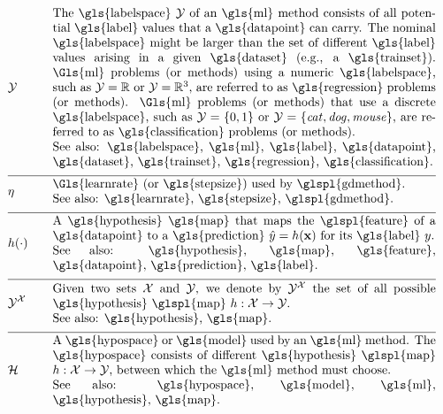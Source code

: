 \begin{align}
	&\labelspace  &\quad & \parbox{.90\textwidth}{The \gls{labelspace} $\labelspace$ of 
		an \gls{ml} method consists of all potential \gls{label} values that a \gls{datapoint} can 
		carry. The nominal \gls{labelspace} might be larger than the set of different \gls{label} 
		values arising in a given \gls{dataset} (e.g., a \gls{trainset}). \Gls{ml} problems 
		(or methods) using a numeric \gls{labelspace}, such as $\labelspace=\mathbb{R}$ 
		or $\labelspace=\mathbb{R}^{3}$, are referred to as \gls{regression} problems (or methods). \Gls{ml} 
		problems (or methods) that use a discrete \gls{labelspace}, such as $\labelspace=\{0,1\}$ or $\labelspace=\{\mbox{\emph{cat}},\mbox{\emph{dog}},\mbox{\emph{mouse}}\}$, 
		are referred to as \gls{classification} problems (or methods).
		\\ See also: \gls{labelspace}, \gls{ml}, \gls{label}, \gls{datapoint},  \gls{dataset}, \gls{trainset}, 
		\gls{regression}, \gls{classification}.}  \nonumber \\[2mm] \hline \nonumber\\[-5mm]
	&\lrate  &\quad & \parbox{.90\textwidth}{\Gls{learnrate} (or \gls{stepsize}) used by \glspl{gdmethod}.
		\\ See also: \gls{learnrate}, \gls{stepsize}, \glspl{gdmethod}. }  \nonumber \\[2mm] \hline \nonumber\\[-5mm]
	&\hypothesis(\cdot)  &\quad &\parbox{.90\textwidth}{A \gls{hypothesis} \gls{map} that maps the \glspl{feature} of a \gls{datapoint} 
		to a \gls{prediction} $\hat{\truelabel}=\hypothesis(\featurevec)$ for its \gls{label} $\truelabel$.
		\\ See also: \gls{hypothesis}, \gls{map}, \gls{feature}, \gls{datapoint}, \gls{prediction}, \gls{label}. }  	 \nonumber \\[2mm] \hline \nonumber\\[-5mm]
	 &\labelspace^{\featurespace} &\quad & \parbox{.90\textwidth}{Given two sets $\featurespace$ and $\labelspace$, we denote by $\labelspace^{\featurespace}$ 
	 	the set of all possible \gls{hypothesis} \glspl{map} $\hypothesis: \featurespace \rightarrow \labelspace$.
		\\ See also: \gls{hypothesis}, \gls{map}. } 	 \nonumber \\[2mm] \hline \nonumber\\[-5mm]
	&\hypospace  &\quad & \parbox{.90\textwidth}{A \gls{hypospace} or \gls{model} used by an \gls{ml} method. 
		The \gls{hypospace} consists of different \gls{hypothesis} \glspl{map} $\hypothesis: \featurespace \rightarrow \labelspace$, between which 
		the \gls{ml} method must choose.
		\\ See also: \gls{hypospace}, \gls{model}, \gls{ml}, \gls{hypothesis}, \gls{map}. }   \nonumber 
\end{align}     

